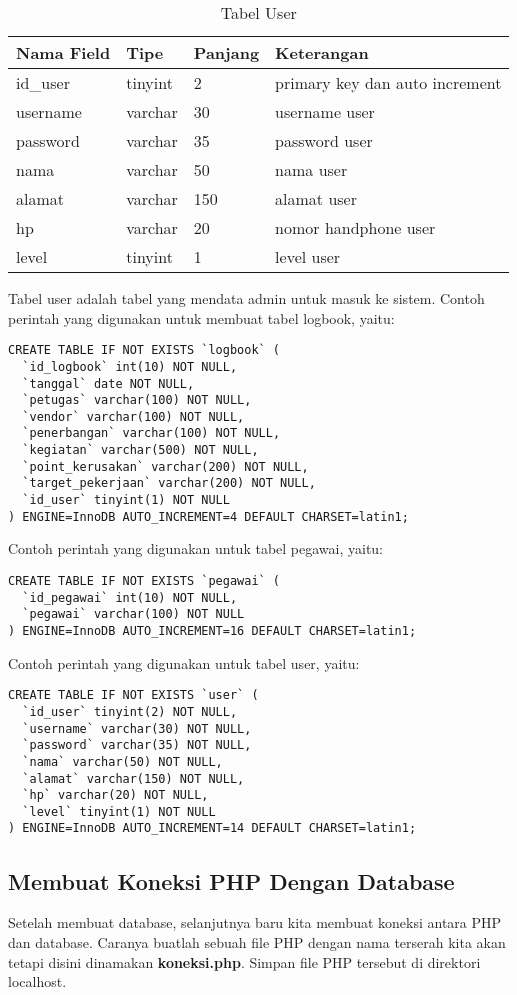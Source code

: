  \begin{table}[h]
\caption{Tabel User}
\centering
\begin{tabular}{ |p{2cm}|p{1cm}|p{1cm}|p{5cm}| }
 \hline
 \textbf{Nama Field} & \textbf{Tipe} & \textbf{Panjang} & \textbf{Keterangan}\\
 \hline
id\_user & tinyint & 2 & primary key dan auto increment\\
 \hline
username & varchar & 30 & username user\\
 \hline
password & varchar & 35 & password user\\
 \hline
nama & varchar & 50 & nama user\\
 \hline
alamat & varchar & 150 & alamat user\\
 \hline
hp & varchar & 20 & nomor handphone user\\
 \hline
level & tinyint & 1 & level user\\
 \hline
\end{tabular}
\end{table}
Tabel user adalah tabel yang mendata admin untuk masuk ke sistem.
Contoh perintah yang digunakan untuk membuat tabel logbook, yaitu:
\begin{lstlisting}
CREATE TABLE IF NOT EXISTS `logbook` (
  `id_logbook` int(10) NOT NULL,
  `tanggal` date NOT NULL,
  `petugas` varchar(100) NOT NULL,
  `vendor` varchar(100) NOT NULL,
  `penerbangan` varchar(100) NOT NULL,
  `kegiatan` varchar(500) NOT NULL,
  `point_kerusakan` varchar(200) NOT NULL,
  `target_pekerjaan` varchar(200) NOT NULL,
  `id_user` tinyint(1) NOT NULL
) ENGINE=InnoDB AUTO_INCREMENT=4 DEFAULT CHARSET=latin1;
\end{lstlisting}
Contoh perintah yang digunakan untuk tabel pegawai, yaitu:
\begin{lstlisting}
CREATE TABLE IF NOT EXISTS `pegawai` (
  `id_pegawai` int(10) NOT NULL,
  `pegawai` varchar(100) NOT NULL
) ENGINE=InnoDB AUTO_INCREMENT=16 DEFAULT CHARSET=latin1;
\end{lstlisting}
Contoh perintah yang digunakan untuk tabel user, yaitu:
\begin{lstlisting}
CREATE TABLE IF NOT EXISTS `user` (
  `id_user` tinyint(2) NOT NULL,
  `username` varchar(30) NOT NULL,
  `password` varchar(35) NOT NULL,
  `nama` varchar(50) NOT NULL,
  `alamat` varchar(150) NOT NULL,
  `hp` varchar(20) NOT NULL,
  `level` tinyint(1) NOT NULL
) ENGINE=InnoDB AUTO_INCREMENT=14 DEFAULT CHARSET=latin1;
\end{lstlisting}

\subsection{Membuat Koneksi PHP Dengan Database}
Setelah membuat database, selanjutnya baru kita membuat koneksi antara PHP dan database. Caranya buatlah sebuah file PHP dengan nama terserah kita akan tetapi disini dinamakan \textbf{koneksi.php}. Simpan file PHP tersebut di direktori localhost.

